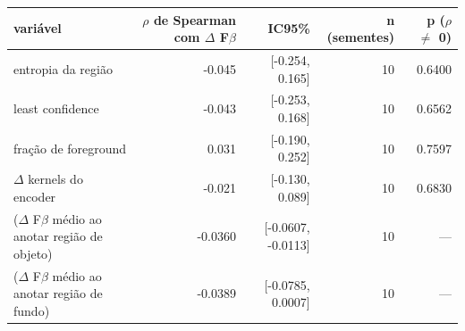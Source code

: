 \begin{tabular}{lrrrr}
\hline
variável & $\rho$ de Spearman com $\Delta$ F$\beta$ & IC95\% & n (sementes) & p ($\rho$ $\neq$ 0) \\
\hline
entropia da região & -0.045 & [-0.254, 0.165] & 10 & 0.6400 \\
least confidence & -0.043 & [-0.253, 0.168] & 10 & 0.6562 \\
fração de foreground & 0.031 & [-0.190, 0.252] & 10 & 0.7597 \\
$\Delta$ kernels do encoder & -0.021 & [-0.130, 0.089] & 10 & 0.6830 \\
($\Delta$ F$\beta$ médio ao anotar região de objeto) & -0.0360 & [-0.0607, -0.0113] & 10 & --- \\
($\Delta$ F$\beta$ médio ao anotar região de fundo) & -0.0389 & [-0.0785, 0.0007] & 10 & --- \\
\hline
\end{tabular}
